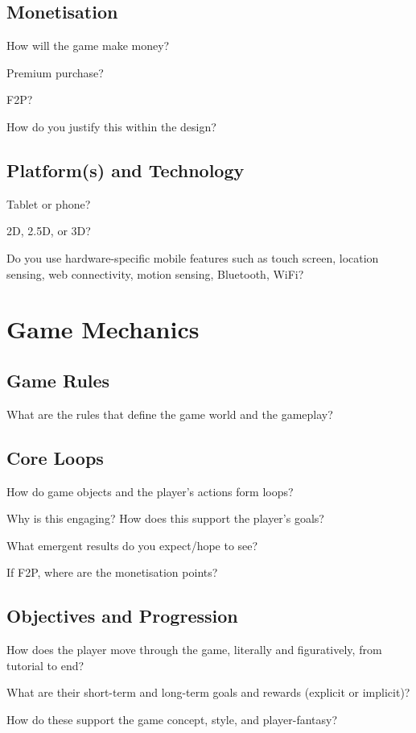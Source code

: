 \documentclass{scrartcl}
\begin{document}
\subsection{Monetisation}

How will the game make money?

Premium purchase?

F2P?

How do you justify this within the design?

\subsection{Platform(s) and Technology}

Tablet or phone?

2D, 2.5D, or 3D?

Do you use hardware-specific mobile features such as touch screen, location sensing, web connectivity, motion sensing, Bluetooth, WiFi?

\section{
  Game Mechanics
 }

\subsection{Game Rules}

What are the rules that define the game world and the gameplay?

\subsection{Core Loops}

How do game objects and the player’s actions form loops?

Why is this engaging? How does this support the player’s goals?

What emergent results do you expect/hope to see?

If F2P, where are the monetisation points?

\subsection{Objectives and Progression}

How does the player move through the game, literally and figuratively, from tutorial to end?

What are their short-term and long-term goals and rewards (explicit or implicit)?

How do these support the game concept, style, and player-fantasy?

\printbibliography
\end{document}

